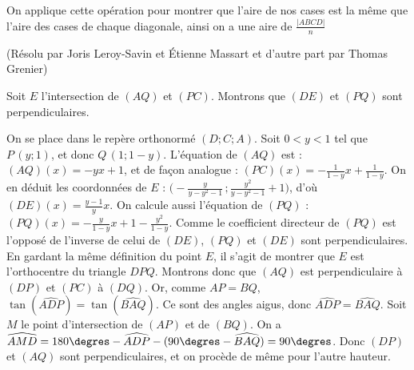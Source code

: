 \begin{sol}[66]

On applique cette opération pour montrer que l'aire de nos cases est la même que l'aire des cases de  chaque diagonale, ainsi on a une aire de $\frac{|ABCD|}{n}$
\end{sol}

\begin{sol}[67](Résolu par Joris Leroy-Savin et \'Etienne Massart et d'autre part par Thomas Grenier)

Soit $E$ l'intersection de $(AQ)$ et $(PC)$. Montrons que $(DE)$ et $(PQ)$
sont perpendiculaires.

On se place dans le repère orthonormé $(D;C;A)$. Soit $0<y<1$ tel que 
$P\,(y;1)$, et donc $Q\,(1;1-y)$.
L'équation de $(AQ)$ est : $(AQ)(x)=-yx+1$, et de façon analogue : 
$(PC)(x)=-\frac{1}{1-y}x+\frac{1}{1-y}$.
On en déduit les coordonnées de $E$ : $\bigg(-\frac{y}{y-y^2-1}\,;
\frac{y^2}{y-y^2-1}+1\bigg)$, d'où $(DE)(x)=\frac{y-1}{y}x$.
On calcule aussi l'équation de $(PQ)$ : 
$(PQ)(x) = -\frac{y}{1-y}x+1-\frac{y^2}{1-y}$.
Comme le coefficient directeur de $(PQ)$ est l'opposé de l'inverse de
celui de $(DE)$, $(PQ)$ et $(DE)$ sont perpendiculaires.\\
 
\; En gardant la même définition du point $E$,
il s'agit de montrer que $E$ est l'orthocentre du triangle $DPQ$. Montrons
donc que $(AQ)$ est perpendiculaire à $(DP)$ et $(PC)$ à $(DQ)$. Or, comme
$AP=BQ$, $\tan(\widehat{ADP})=\tan(\widehat{BAQ})$. Ce sont des angles aigus,
donc $\widehat{ADP}=\widehat{BAQ}$. Soit $M$ le point d'intersection
de $(AP)$ et de $(BQ)$. 
On a $\widehat{AMD}=180\degres - \widehat{ADP}
 - (90\degres-\widehat{BAQ})=90\degres$. Donc $(DP)$ et $(AQ)$ sont 
 perpendiculaires, et on procède de même pour l'autre hauteur.

\end{sol}

